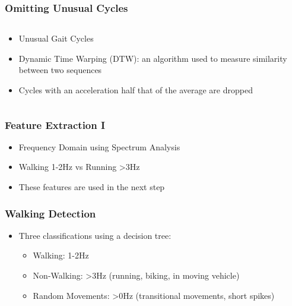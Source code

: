 \documentclass{beamer}
\begin{document}
\begin{frame}
  \frametitle{Omitting Unusual Cycles}
  \begin{columns}
  \begin{column}{.7\textwidth}
  \begin{itemize}
  	\item Unusual Gait Cycles
  	\linebreak
  	\item Dynamic Time Warping (DTW): an algorithm used to measure similarity between two sequences
  	\linebreak
  	\item Cycles with an acceleration half that of the average are dropped
  \end{itemize}
  \end{column}
    \begin{column}{0.5\textwidth}
       \\
  \end{column}
  \end{columns}
\end{frame}

\begin{frame}
\frametitle{Feature Extraction I}
	\begin{itemize}
		\item Frequency Domain using Spectrum Analysis
		\linebreak
		\item Walking 1-2Hz vs Running >3Hz 
		\linebreak
		\item These features are used in the next step
		
	\end{itemize}
	
\end{frame}

\begin{frame}
\frametitle{Walking Detection}
	\begin{itemize}
		\item Three classifications using a decision tree:
			\begin{itemize}
				\item Walking: 1-2Hz
				\linebreak
				\item Non-Walking: >3Hz (running, biking, in moving vehicle)
				\linebreak
				\item Random Movements: >0Hz (transitional movements, short spikes)
			\end{itemize}
		
	\end{itemize}
\end{frame}
\end{document}
